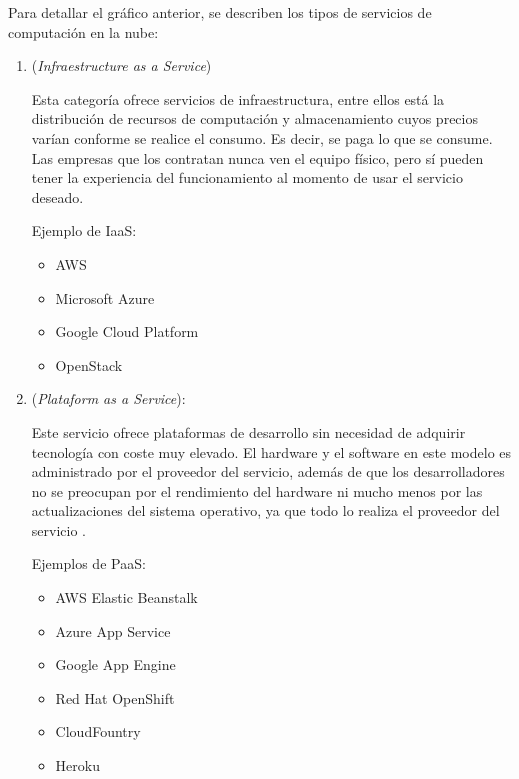 
Para detallar el gráfico anterior, se describen los tipos de servicios de computación en la nube:

\vspace{1cm}

\begin{enumerate}

\item {}  (\emph{Infraestructure  as  a  Service})

Esta categoría ofrece servicios de infraestructura, entre ellos está la distribución de recursos de computación y almacenamiento cuyos precios varían conforme se realice el consumo. Es decir, se paga lo que se consume. Las empresas que los contratan nunca ven el equipo físico, pero sí pueden tener la experiencia del funcionamiento al momento de usar el servicio deseado.

Ejemplo de IaaS:

\begin{itemize}
\item AWS
\item Microsoft Azure
\item Google Cloud Platform
\item OpenStack
\end{itemize}

\vspace{0.5cm}

\item {} (\emph{Plataform as a Service}):

Este servicio ofrece plataformas de desarrollo sin necesidad de adquirir tecnología con coste muy elevado. El hardware y el software en este modelo es administrado por el proveedor del servicio, además de que los desarrolladores no se preocupan por el rendimiento del hardware ni mucho menos por las actualizaciones del sistema operativo, ya que todo lo realiza el proveedor del servicio .
 
Ejemplos de PaaS:

\begin{itemize}
\item AWS Elastic Beanstalk
\item Azure App Service
\item Google App Engine
\item Red Hat OpenShift
\item CloudFountry
\item Heroku
\end{itemize}


\end{enumerate}

